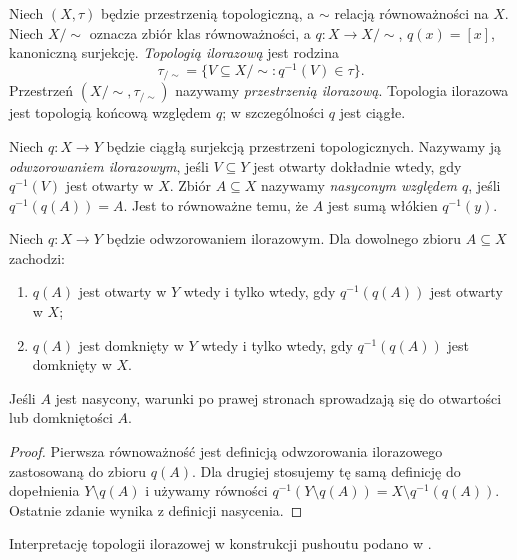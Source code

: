 \begin{definicja}
\label{def:topog-przestrzen-ilorazowa}
Niech $(X,\tau)$ będzie przestrzenią topologiczną,
a $\sim$ relacją równoważności na $X$. Niech $X/{\sim}$
oznacza zbiór klas równoważności, a
$q\colon X\to X/{\sim}$, $q(x)=[x]$, kanoniczną surjekcję.
\emph{Topologią ilorazową} jest rodzina
\[
\tau_{/{\sim}}=\{V\subseteq X/{\sim}:q^{-1}(V)\in\tau\}.
\]
Przestrzeń $(X/{\sim},\tau_{/{\sim}})$ nazywamy
\emph{przestrzenią ilorazową}. Topologia ilorazowa jest
topologią końcową względem $q$; w szczególności $q$ jest ciągłe.
\end{definicja}

\begin{definicja}
\label{def:topog-odwzorowanie-ilorazowe}
Niech $q\colon X\to Y$ będzie ciągłą surjekcją
przestrzeni topologicznych. Nazywamy ją
\emph{odwzorowaniem ilorazowym}, jeśli
$V\subseteq Y$ jest otwarty dokładnie wtedy, gdy
$q^{-1}(V)$ jest otwarty w $X$.
Zbiór $A\subseteq X$ nazywamy \emph{nasyconym względem $q$},
jeśli $q^{-1}(q(A))=A$. Jest to równoważne temu,
że $A$ jest sumą włókien $q^{-1}(y)$.
\end{definicja}

\begin{stwierdzenie}
\label{prop:topog-iloraz-nasycone}
Niech $q\colon X\to Y$ będzie odwzorowaniem ilorazowym.
Dla dowolnego zbioru $A\subseteq X$ zachodzi:
\begin{enumerate}[label=(\roman*)]
\item $q(A)$ jest otwarty w $Y$ wtedy i tylko wtedy, gdy
      $q^{-1}(q(A))$ jest otwarty w $X$;
\item $q(A)$ jest domknięty w $Y$ wtedy i tylko wtedy, gdy
      $q^{-1}(q(A))$ jest domknięty w $X$.
\end{enumerate}
Jeśli $A$ jest nasycony, warunki po prawej stronach
sprowadzają się do otwartości lub domkniętości $A$.
\end{stwierdzenie}
\begin{proof}
Pierwsza równoważność jest definicją odwzorowania
ilorazowego zastosowaną do zbioru $q(A)$.
Dla drugiej stosujemy tę samą definicję do dopełnienia
$Y\setminus q(A)$ i używamy równości
$q^{-1}(Y\setminus q(A))=X\setminus q^{-1}(q(A))$.
Ostatnie zdanie wynika z definicji nasycenia.
\end{proof}

Interpretację topologii ilorazowej w konstrukcji pushoutu podano w .

